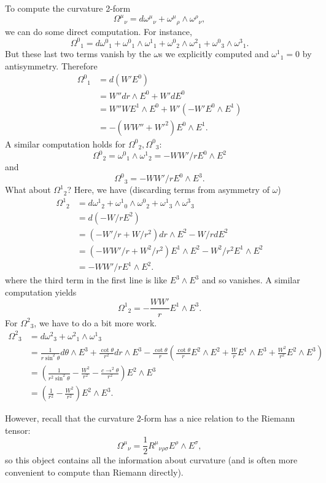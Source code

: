 To compute the curvature 2-form
$$\Omega^\mu{}_\nu=d\omega^\mu{}_\nu+\omega^\mu{}_\rho \wedge \omega^\rho{}_\nu,$$
we can do some direct computation. For instance,
$$\Omega^0{}_1=d\omega^0{}_1+\omega^0{}_1 \wedge \omega^1{}_1 +\omega^0{}_2 \wedge \omega^2{}_1 +\omega^0{}_3 \wedge \omega^3{}_1.$$
But these last two terms vanish by the $\omega$s we explicitly computed and $\omega^1{}_1=0$ by antisymmetry. Therefore
\begin{align*}
    \Omega^0{}_1&= d(W'E^0)\\
    &=W'' dr \wedge E^0 + W'dE^0\\
    &=W'' W E^1\wedge E^0 +W'(-W' E^0 \wedge E^1)\\
    &=-(WW''+{W'}^2)E^0 \wedge E^1.
\end{align*}
A similar computation holds for $\Omega^0{}_2,\Omega^0{}_3$:
$$\Omega^0{}_2 = \omega^0{}_1 \wedge \omega^1{}_2 = -WW'/r E^0 \wedge E^2$$
and
$$\Omega^0{}_3=-WW'/r E^0 \wedge E^3.$$
What about $\Omega^1{}_2$? Here, we have (discarding terms from asymmetry of $\omega$)
\begin{align*}
    \Omega^1{}_2&= d\omega^1{}_2+\omega^1{}_0 \wedge \omega^0{}_2 + \omega^1{}_3 \wedge \omega^3{}_3\\
    &= d(-W/r E^2)\\
    &=(-W'/r+W/r^2) dr \wedge E^2 -W/r dE^2\\
    &=(-WW'/r + W^2/r^2)E^1 \wedge E^2 -W^2/r^2 E^1 \wedge E^2\\
    &=-WW'/r E^1 \wedge E^2.
\end{align*}
where the third term in the first line is like $E^3\wedge E^3$ and so vanishes.
A  similar computation yields
$$\Omega^1{}_2 = -\frac{WW'}{r} E^1 \wedge E^3.$$
For $\Omega^2{}_3$, we have to do a bit more work.
\begin{align*}
    \Omega^2{}_3 &= d\omega^2{}_3 +\omega^2{}_1 \wedge \omega^1{}_3\\
    &=\frac{1}{r\sin^2\theta}d\theta \wedge E^3 + \frac{\cot\theta}{r^2}dr \wedge E^3 -\frac{\cot\theta}{r}\left(\frac{\cot\theta}{r}E^2 \wedge E^2 +\frac{W}{r} E^1 \wedge E^3 +\frac{W^2}{r^2}E^2 \wedge E^3\right)\\
    &=\left(\frac{1}{r^2 \sin^2\theta}-\frac{W^2}{r^2}-\frac{c\to^2\theta}{r^2}\right)E^2\wedge E^3\\
    &=\left(\frac{1}{r^2}-\frac{W^2}{r^2}\right) E^2 \wedge E^3.
\end{align*}

However, recall that the curvature $2$-form has a nice relation to the Riemann tensor:
$$\Omega^\mu{}_\nu=\frac{1}{2}R^\mu{}_{\nu\rho\sigma}E^\rho \wedge E^\sigma,$$
so this object contains all the information about curvature (and is often more convenient to compute than Riemann directly).

